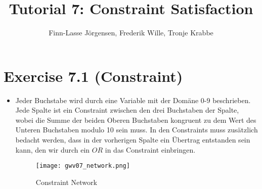 \documentclass[12pt,a4paper]{article}
\author{Finn-Lasse Jörgensen, Frederik Wille, Tronje Krabbe}
\title{Tutorial 7: Constraint Satisfaction}
\begin{document}
\maketitle

\section*{Exercise 7.1 (Constraint)}
\begin{itemize}
\item
Jeder Buchstabe wird durch eine Variable mit der Domäne 0-9 beschrieben.
Jede Spalte ist ein Constraint zwischen den drei Buchstaben der Spalte, wobei die Summe der beiden Oberen Buchstaben kongruent zu dem Wert des Unteren Buchstaben modulo 10 sein muss.
In den Constraints muss zusätzlich bedacht werden, dass in der vorherigen Spalte ein Übertrag entstanden sein kann, den wir durch ein $OR$ in das Constraint einbringen.\\
\begin{figure}[ht]
    \texttt{[image: gwv07\_network.png]}
    \caption{Constraint Network}
    \label{network}
\end{figure}
\end{itemize}
\end{document}
